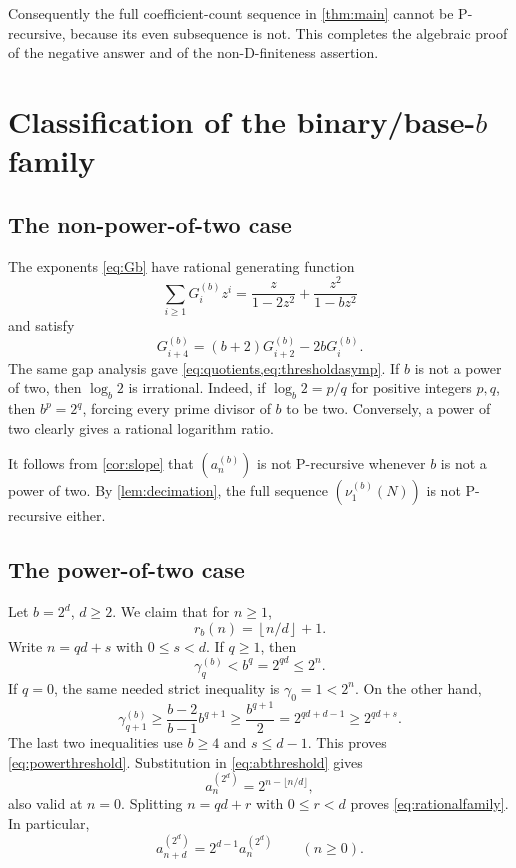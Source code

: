 \documentclass[11pt,letterpaper]{article}
\numberwithin{equation}{section}
\theoremstyle{definition}
\theoremstyle{remark}
\newcommand{\floor}[1]{\left\lfloor#1\right\rfloor}
\begin{document}
Consequently the full coefficient-count sequence in \cref{thm:main} cannot be P-recursive, because its even subsequence is not. This completes the algebraic proof of the negative answer and of the non-D-finiteness assertion.

\section{Classification of the binary/base-\texorpdfstring{$b$}{b} family}\label{sec:classification}

\subsection{The non-power-of-two case}
The exponents \eqref{eq:Gb} have rational generating function
\begin{equation}\label{eq:GbGF}
 \sum_{i\ge1}G_i^{(b)}z^i
 =\frac{z}{1-2z^2}+\frac{z^2}{1-bz^2}
\end{equation}
and satisfy
\begin{equation}\label{eq:Gbrec}
 G_{i+4}^{(b)}=(b+2)G_{i+2}^{(b)}-2bG_i^{(b)}.
\end{equation}
The same gap analysis gave \cref{eq:quotients,eq:thresholdasymp}. If $b$ is not a power of two, then $\log_b2$ is irrational. Indeed, if $\log_b2=p/q$ for positive integers $p,q$, then $b^p=2^q$, forcing every prime divisor of $b$ to be two. Conversely, a power of two clearly gives a rational logarithm ratio.

It follows from \cref{cor:slope} that $(a_n^{(b)})$ is not P-recursive whenever $b$ is not a power of two. By \cref{lem:decimation}, the full sequence $(\nu_1^{(b)}(N))$ is not P-recursive either.

\subsection{The power-of-two case}
Let $b=2^d$, $d\ge2$. We claim that for $n\ge1$,
\begin{equation}\label{eq:powerthreshold}
 r_b(n)=\floor{n/d}+1.
\end{equation}
Write $n=qd+s$ with $0\le s<d$. If $q\ge1$, then
\[
 \gamma_q^{(b)}<b^q=2^{qd}\le2^n.
\]
If $q=0$, the same needed strict inequality is $\gamma_0=1<2^n$.
On the other hand,
\[
 \gamma_{q+1}^{(b)}
 \ge\frac{b-2}{b-1}b^{q+1}
 \ge\frac{b^{q+1}}{2}
 =2^{qd+d-1}\ge2^{qd+s}.
\]
The last two inequalities use $b\ge4$ and $s\le d-1$. This proves \eqref{eq:powerthreshold}. Substitution in \eqref{eq:abthreshold} gives
\[
 a_n^{(2^d)}=2^{n-\lfloor n/d\rfloor},
\]
also valid at $n=0$. Splitting $n=qd+r$ with $0\le r<d$ proves \eqref{eq:rationalfamily}. In particular,
\begin{equation}\label{eq:powerrec}
 a_{n+d}^{(2^d)}=2^{d-1}a_n^{(2^d)}\qquad(n\ge0).
\end{equation}
\end{document}
